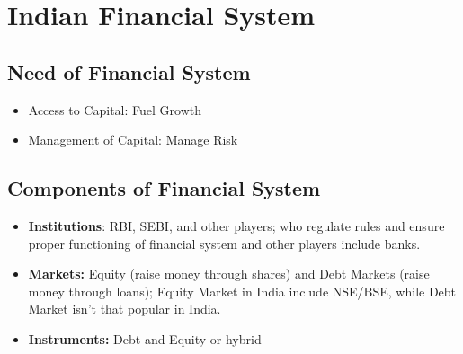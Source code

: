 \documentclass{article}
\begin{document}
\section{Indian Financial System}
\subsection{Need of Financial System}
\begin{itemize}
    \item Access to Capital: Fuel Growth
    \item Management of Capital: Manage Risk 
\end{itemize}
\subsection{Components of Financial System}
\begin{itemize}
    \item \textbf{Institutions}: RBI, SEBI, and other players; who regulate rules and ensure proper functioning of financial system and other players include banks.
    \item \textbf{Markets:} Equity (raise money through shares) and Debt Markets (raise money through loans); Equity Market in India include NSE/BSE, while Debt Market isn't that popular in India.
    \item \textbf{Instruments:} Debt and Equity or hybrid 
\end{itemize}
\end{document}
